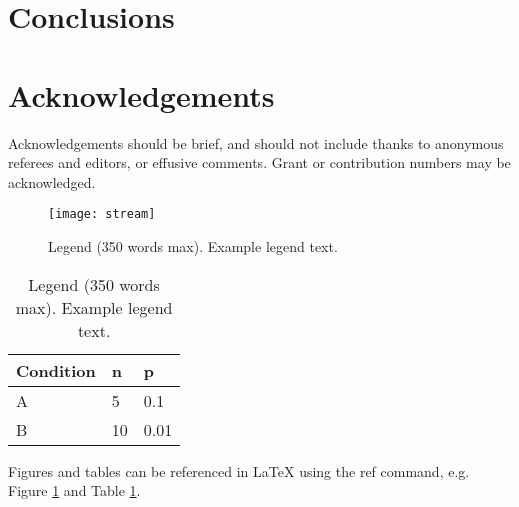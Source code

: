 \documentclass[fleqn,10pt]{wlscirep}
\begin{document}
\section*{Conclusions}





\section*{Acknowledgements}

Acknowledgements should be brief, and should not include thanks to anonymous referees and editors, or effusive comments. Grant or contribution numbers may be acknowledged.

\begin{figure}[ht]
\centering
\texttt{[image: stream]}
\caption{Legend (350 words max). Example legend text.}
\label{fig:stream}
\end{figure}

\begin{table}[ht]
\centering
\begin{tabular}{|l|l|l|}
\hline
Condition & n & p \\
\hline
A & 5 & 0.1 \\
\hline
B & 10 & 0.01 \\
\hline
\end{tabular}
\caption{\label{tab:example}Legend (350 words max). Example legend text.}
\end{table}

Figures and tables can be referenced in LaTeX using the ref command, e.g. Figure \ref{fig:stream} and Table \ref{tab:example}.
\end{document}
